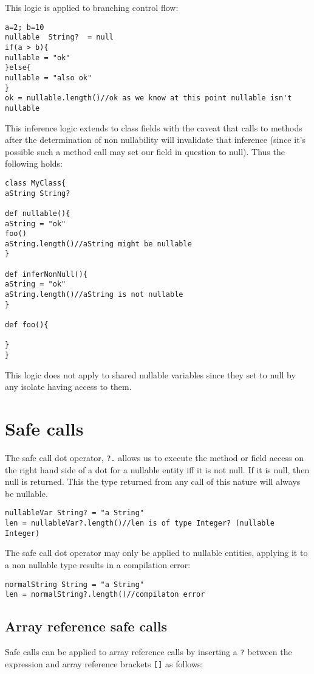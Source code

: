 \documentclass[conc-doc]{subfiles}
\begin{document}
This logic is applied to branching control flow:

\begin{lstlisting}
a=2; b=10
nullable  String?  = null
if(a > b){
nullable = "ok"
}else{
nullable = "also ok"
}
ok = nullable.length()//ok as we know at this point nullable isn't nullable
\end{lstlisting}

This inference logic extends to class fields with the caveat that calls to methods after the determination of non nullability will invalidate that inference (since it's possible such a method call may set our field in question to null). Thus the following holds:

\begin{lstlisting}
class MyClass{
aString String?

def nullable(){
aString = "ok"
foo()
aString.length()//aString might be nullable
}

def inferNonNull(){
aString = "ok"
aString.length()//aString is not nullable
}

def foo(){

}
}
\end{lstlisting}

This logic does not apply to shared nullable variables since they set to null by any isolate having access to them.


\section{Safe calls}
The safe call dot operator, \lstinline{?.} allows us to execute the method or field access on the right hand side of a dot for a nullable entity iff it is not null. If it is null, then null is returned. This the type returned from any call of this nature will always be nullable.

\begin{lstlisting}
nullableVar String? = "a String"
len = nullableVar?.length()//len is of type Integer? (nullable Integer)
\end{lstlisting}

The safe call dot operator may only be applied to nullable entities, applying it to a non nullable type results in a compilation error:

\begin{lstlisting}
normalString String = "a String"
len = normalString?.length()//compilaton error
\end{lstlisting}

\subsection{ Array reference safe calls }
Safe calls can be applied to array reference calls by inserting a \lstinline{?} between the expression and array reference brackets \lstinline{[]} as follows:
\end{document}
